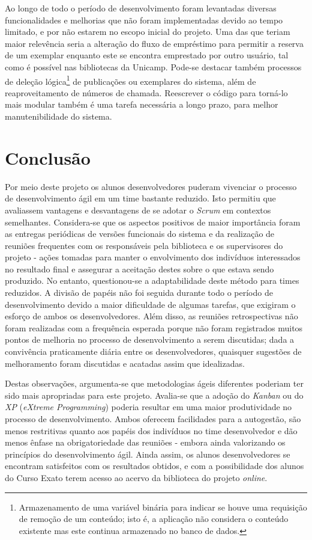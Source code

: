 \documentclass[a4paper]{article}
\begin{document}
Ao longo de todo o período de desenvolvimento foram levantadas diversas funcionalidades e melhorias que não foram implementadas devido ao tempo limitado, e por não estarem no escopo inicial do projeto. Uma das que teriam maior relevência seria a alteração do fluxo de empréstimo para permitir a reserva de um exemplar enquanto este se encontra emprestado por outro usuário, tal como é possível nas bibliotecas da Unicamp. Pode-se destacar também processos de deleção lógica\footnote{Armazenamento de uma variável binária para indicar se houve uma requisição de remoção de um conteúdo; isto é, a aplicação não considera o conteúdo existente mas este continua armazenado no banco de dados.} de publicações ou exemplares do sistema, além de reaproveitamento de números de chamada. Reescrever o código para torná-lo mais modular também é uma tarefa necessária a longo prazo, para melhor manutenibilidade do sistema.

\section{Conclusão}
Por meio deste projeto os alunos desenvolvedores puderam vivenciar o processo de desenvolvimento ágil em um time bastante reduzido. Isto permitiu que avaliassem vantagens e desvantagens de se adotar o \textit{Scrum} em contextos semelhantes. Considera-se que os aspectos positivos de maior importância foram as entregas periódicas de versões funcionais do sistema e da realização de reuniões frequentes com os responsáveis pela biblioteca e os supervisores do projeto - ações tomadas para manter o envolvimento dos indivíduos interessados no resultado final e assegurar a aceitação destes sobre o que estava sendo produzido. No entanto, questionou-se a adaptabilidade deste método para times reduzidos. A divisão de papéis não foi seguida durante todo o período de desenvolvimento devido a maior dificuldade de algumas tarefas, que exigiram o esforço de ambos os desenvolvedores. Além disso, as reuniões retrospectivas não foram realizadas com a frequência esperada porque não foram registrados muitos pontos de melhoria no processo de desenvolvimento a serem discutidas; dada a convivência praticamente diária entre os desenvolvedores, quaisquer sugestões de melhoramento foram discutidas e acatadas assim que idealizadas.

Destas observações, argumenta-se que metodologias ágeis diferentes poderiam ter sido mais apropriadas para este projeto. Avalia-se que a adoção do \textit{Kanban} \cite{kanban} ou do \textit{XP} (\textit{eXtreme Programming}) \cite{xp} poderia resultar em uma maior produtividade no processo de desenvolvimento. Ambos oferecem facilidades para a autogestão, são menos restritivas quanto aos papéis dos indivíduos no time desenvolvedor e dão menos ênfase na obrigatoriedade das reuniões - embora ainda valorizando os princípios do desenvolvimento ágil. Ainda assim, os alunos desenvolvedores se encontram satisfeitos com os resultados obtidos, e com a possibilidade dos alunos do Curso Exato terem acesso ao acervo da biblioteca do projeto \textit{online}.
\end{document}
